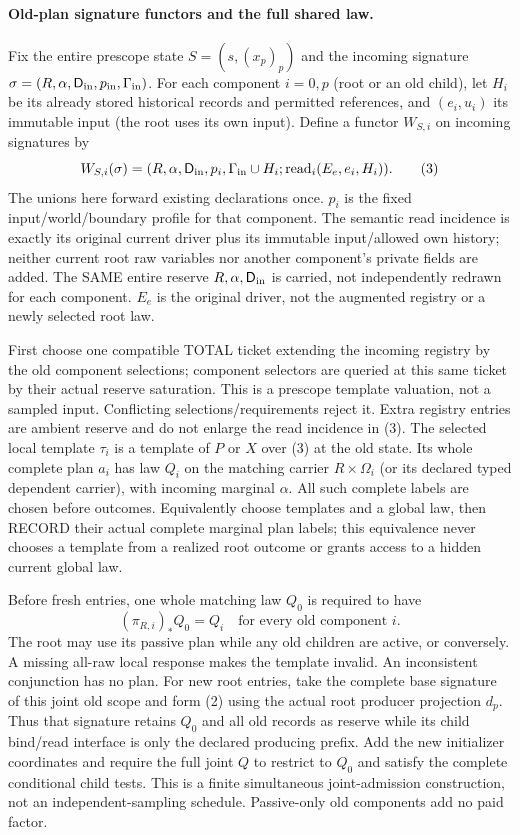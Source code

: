 \documentclass[11pt]{article}
\begin{document}
\paragraph{Old-plan signature functors and the full shared law.}
Fix the entire prescope state $S=(s,(x_p)_p)$ and the incoming signature
$\sigma=(R,\alpha,\mathsf D_{\rm in},p_{\rm in},\Gamma_{\rm in})$.
For each component $i=0,p$ (root or an old child), let $H_i$ be its already stored historical records and permitted references, and $(e_i,u_i)$ its immutable input (the root uses its own input). Define a functor $W_{S,i}$ on incoming signatures by
\[
 W_{S,i}(\sigma)=
 (R,\alpha,\mathsf D_{\rm in},p_i,
    \Gamma_{\rm in}\cup H_i;\operatorname{read}_i(E_e,e_i,H_i)). \tag{3}
\]
The unions here forward existing declarations once. $p_i$ is the fixed input/world/boundary profile for that component. The semantic read incidence is exactly its original current driver plus its immutable input/allowed own history; neither current root raw variables nor another component's private fields are added. The SAME entire reserve $R,\alpha,\mathsf D_{\rm in}$ is carried, not independently redrawn for each component. $E_e$ is the original driver, not the augmented registry or a newly selected root law.

First choose one compatible TOTAL ticket extending the incoming registry by the old component selections; component selectors are queried at this same ticket by their actual reserve saturation. This is a prescope template valuation, not a sampled input. Conflicting selections/requirements reject it. Extra registry entries are ambient reserve and do not enlarge the read incidence in (3). The selected local template $\tau_i$ is a template of $P$ or $X$ over (3) at the old state. Its whole complete plan $a_i$ has law $Q_i$ on the matching carrier $R\times\Omega_i$ (or its declared typed dependent carrier), with incoming marginal $\alpha$. All such complete labels are chosen before outcomes. Equivalently choose templates and a global law, then RECORD their actual complete marginal plan labels; this equivalence never chooses a template from a realized root outcome or grants access to a hidden current global law.

Before fresh entries, one whole matching law $Q_0$ is required to have
\[
 (\pi_{R,i})_*Q_0=Q_i\quad\text{for every old component }i.     \tag{4}
\]
The root may use its passive plan while any old children are active, or conversely. A missing all-raw local response makes the template invalid. An inconsistent conjunction has no plan. For new root entries, take the complete base signature of this joint old scope and form (2) using the actual root producer projection $d_p$. Thus that signature retains $Q_0$ and all old records as reserve while its child bind/read interface is only the declared producing prefix. Add the new initializer coordinates and require the full joint $Q$ to restrict to $Q_0$ and satisfy the complete conditional child tests. This is a finite simultaneous joint-admission construction, not an independent-sampling schedule. Passive-only old components add no paid factor.
\end{document}

